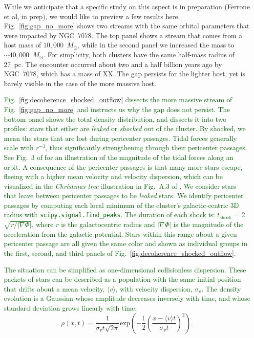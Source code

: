 \documentclass{aa}
\newcommand{\salvatore}[1]{\textcolor{darkgreen}{{#1}}}
\begin{document}
\begin{appendix}
While we anticipate that a specific study on this aspect is in preparation (Ferrone et al, in prep), we would like to preview a few results here.
Fig.~\ref{fig:gap_no_more} shows two streams with the same orbital parameters that were impacted by NGC~7078. The top panel shows a stream that comes from a host mass of $10,000$~$M_\odot$, while in the second panel we increased the mass to $\sim40,000$~$M_\odot$. For simplicity, both clusters have the same half-mass radius of 27~pc. The encounter occurred about two and a half billion years ago by NGC~7078, which has a mass of XX. The gap persists for the lighter host, yet is barely visible in the case of the more massive host. 

\salvatore{Fig.~\ref{fig:decoherence_shocked_outflow} dissects the more massive stream of Fig.~\ref{fig:gap_no_more} and instructs us why the gap does not persist. The bottom panel shows the total density distribution, and dissects it into two profiles: stars that either are \textit{leaked} or \textit{shocked} out of the cluster. By shocked, we mean the stars that are lost during pericenter passages. Tidal forces generally scale with $r^{-3}$, thus significantly strengthening through their pericenter passages. See Fig.~3 of \citet{2004AJ....127.2753D} for an illustration of the magnitude of the tidal forces along an orbit. A consequence of the pericenter passages is that many more stars escape, fleeing with a higher mean velocity and velocity dispersion, which can be visualized in the \textit{Christmas tree} illustration in Fig.~A.3 of \citet{2012A&A...546L...7M}. We consider stars that leave between pericenter passages to be \textit{leaked} stars. We identify pericenter passages by computing each local minimum of the cluster's galactic-centric 3D radius with \texttt{scipy.signal.find\_peaks}. The duration of each shock is: $t_{\textrm{shock}}$ = 2$\sqrt{r/|\nabla\Phi|}$, where $r$ is the galactocentric radius and $|\nabla\Phi|$ is the magnitude of the acceleration from the galactic potential. Stars within this range about a given pericenter passage are all given the same color and shown as individual groups in the first, second, and third panels of Fig.~\ref{fig:decoherence_shocked_outflow}.}


\salvatore{The situation can be simplified as one-dimensional collisionless dispersion. These packets of stars can be described as a population with the same initial position that drifts about a mean velocity, $\langle v \rangle$, with velocity dispersion, $\sigma_v$. The density evolution is a Gaussian whose amplitude decreases inversely with time, and whose standard deviation grows linearly with time:}
\begin{equation}    
        \rho(x,t) = \frac{1}{\sigma_v t \sqrt{2\pi} }\textrm{exp}\left(-\frac{1}{2}\left(\frac{x-\langle v \rangle t}{\sigma_v t}\right)^2\right).
\end{equation}


\end{appendix}
\end{document}
